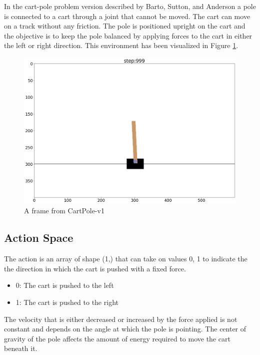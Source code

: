 \documentclass{article} %
\begin{document}
In the cart-pole problem version described by Barto, Sutton, and Anderson 
\cite{barto1983neuronlike} a pole is
connected to a cart through a joint that cannot be moved. The cart can move on a track
without any friction. The pole is positioned upright on the cart and the objective is to
keep the pole balanced by applying forces to the cart in either the left or right direction.
This environment has been visualized in Figure \ref{fig:cartpole-rendering}.

\begin{figure}[h]
    \begin{center}
        \includegraphics[width=\textwidth]{cartpole.png}
    \end{center}
    \caption{A frame from CartPole-v1}
    \label{fig:cartpole-rendering}
\end{figure}

\subsection{Action Space}
The action is an array of shape (1,) that can take on values {0, 1} to indicate the
the direction in which the cart is pushed with a fixed force.

\begin{itemize}
    \item 0: The cart is pushed to the left
    \item 1: The cart is pushed to the right
\end{itemize}

The velocity that is either decreased or increased by the force applied is not constant
and depends on the angle at which the pole is pointing. The center of gravity of the pole
affects the amount of energy required to move the cart beneath it.
\end{document}
